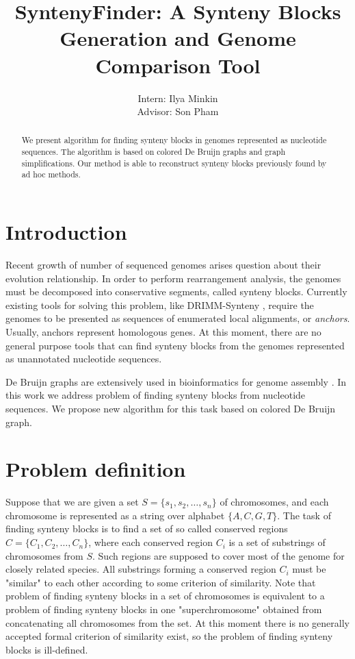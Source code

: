 \documentclass[a4paper,12pt]{scrartcl}
\begin{document}
\title{SyntenyFinder: A Synteny Blocks Generation and Genome Comparison Tool}
\author{Intern: Ilya Minkin\\
	Advisor: Son Pham}
\date{}
\maketitle

\begin{abstract}
We present algorithm for finding synteny blocks in genomes represented as nucleotide sequences. The algorithm is based
on colored De Bruijn graphs and graph simplifications. Our method is able to reconstruct synteny blocks previously found
by ad hoc methods.
\end{abstract}

\section{Introduction}

Recent growth of number of sequenced genomes arises question about their evolution relationship. 
In order to perform rearrangement analysis, the genomes must be decomposed into conservative segments,
called synteny blocks. Currently existing tools for solving this problem, like DRIMM-Synteny
\cite{Pham2010}, require the genomes to be presented as sequences of enumerated local alignments, or \textit{anchors}.
Usually, anchors represent homologous genes. At this moment, there are no general purpose tools that can
find synteny blocks from the genomes represented as unannotated nucleotide sequences.

De Bruijn graphs are extensively used in bioinformatics for genome assembly \cite{Pevzner2001, Iqbal2012}. 
In this work we address problem of finding synteny blocks from nucleotide sequences. We propose new 
algorithm for this task based on colored De Bruijn graph.


\section{Problem definition}

Suppose that we are given a set \(S = \lbrace s_{1}, s_{2}, \ldots, s_{n} \rbrace \) of chromosomes, and each
chromosome is represented as a string over alphabet \(\lbrace A, C, G, T \rbrace \). The task of finding synteny
blocks is to find a set of so called conserved regions \(C = \lbrace C_{1}, C_{2}, \ldots , C_{n} \rbrace \), where
each conserved region \(C_{i}\) is a set of substrings of chromosomes from \(S\). Such regions are supposed 
to cover most of the genome for closely related species.  All substrings forming a conserved region \(C_{i}\) must be
 "similar" to each other according to some criterion of similarity. Note that problem of finding synteny blocks in a set
of chromosomes is equivalent to a problem of finding synteny blocks in one "superchromosome" obtained from
concatenating all chromosomes from the set.
At this moment there is no generally accepted formal criterion of similarity exist, so the problem of finding synteny blocks is ill-defined.
\end{document}
